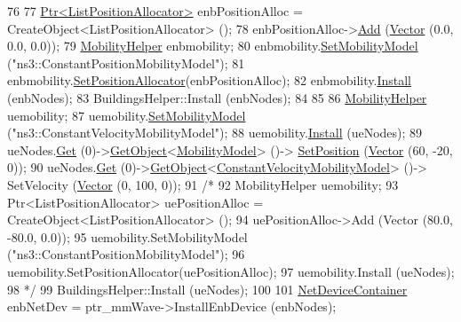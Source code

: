\begin{DoxyCode}
76 
77   \hyperlink{classns3_1_1Ptr}{Ptr<ListPositionAllocator>} enbPositionAlloc = 
      CreateObject<ListPositionAllocator> ();
78   enbPositionAlloc->\hyperlink{classns3_1_1ListPositionAllocator_a460e82f015ac012a73ba0ea0cccb3486}{Add} (\hyperlink{classns3_1_1Vector3D_a7e59b47bc94c9cb1dadff68c1d0112d8}{Vector} (0.0, 0.0, 0.0));
79   \hyperlink{classns3_1_1MobilityHelper}{MobilityHelper} enbmobility;
80   enbmobility.\hyperlink{classns3_1_1MobilityHelper_a030275011b6f40682e70534d30280aba}{SetMobilityModel} (\textcolor{stringliteral}{"ns3::ConstantPositionMobilityModel"});
81   enbmobility.\hyperlink{classns3_1_1MobilityHelper_ac59d5295076be3cc11021566713a28c5}{SetPositionAllocator}(enbPositionAlloc);
82   enbmobility.\hyperlink{classns3_1_1MobilityHelper_a07737960ee95c0777109cf2994dd97ae}{Install} (enbNodes);
83   BuildingsHelper::Install (enbNodes);
84 
85 
86   \hyperlink{classns3_1_1MobilityHelper}{MobilityHelper} uemobility;
87   uemobility.\hyperlink{classns3_1_1MobilityHelper_a030275011b6f40682e70534d30280aba}{SetMobilityModel} (\textcolor{stringliteral}{"ns3::ConstantVelocityMobilityModel"});
88   uemobility.\hyperlink{classns3_1_1MobilityHelper_a07737960ee95c0777109cf2994dd97ae}{Install} (ueNodes);
89   ueNodes.\hyperlink{classns3_1_1NodeContainer_a9ed96e2ecc22e0f5a3d4842eb9bf90bf}{Get} (0)->\hyperlink{classns3_1_1Object_a13e18c00017096c8381eb651d5bd0783}{GetObject}<\hyperlink{classns3_1_1MobilityModel}{MobilityModel}> ()->
      \hyperlink{lena-cqi-threshold_8cc_aac02abe91b3e5592e31bc0f7d844bf4d}{SetPosition} (\hyperlink{classns3_1_1Vector3D_a7e59b47bc94c9cb1dadff68c1d0112d8}{Vector} (60, -20, 0));
90   ueNodes.\hyperlink{classns3_1_1NodeContainer_a9ed96e2ecc22e0f5a3d4842eb9bf90bf}{Get} (0)->\hyperlink{classns3_1_1Object_a13e18c00017096c8381eb651d5bd0783}{GetObject}<\hyperlink{classns3_1_1ConstantVelocityMobilityModel}{ConstantVelocityMobilityModel}> ()->
      SetVelocity (\hyperlink{classns3_1_1Vector3D_a7e59b47bc94c9cb1dadff68c1d0112d8}{Vector} (0, 100, 0));
91   \textcolor{comment}{/*}
92 \textcolor{comment}{  MobilityHelper uemobility;}
93 \textcolor{comment}{  Ptr<ListPositionAllocator> uePositionAlloc = CreateObject<ListPositionAllocator> ();}
94 \textcolor{comment}{  uePositionAlloc->Add (Vector (80.0, -80.0, 0.0));}
95 \textcolor{comment}{  uemobility.SetMobilityModel ("ns3::ConstantPositionMobilityModel");}
96 \textcolor{comment}{  uemobility.SetPositionAllocator(uePositionAlloc);}
97 \textcolor{comment}{  uemobility.Install (ueNodes);}
98 \textcolor{comment}{  */}
99   BuildingsHelper::Install (ueNodes);
100 
101   \hyperlink{classns3_1_1NetDeviceContainer}{NetDeviceContainer} enbNetDev = ptr\_mmWave->InstallEnbDevice (enbNodes);

\end{DoxyCode}
